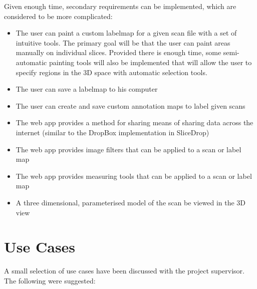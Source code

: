 \documentclass[a4paper,11pt,titlepage]{article}
\begin{document}
Given enough time, secondary requirements can be implemented, which are considered to be more complicated:

\begin{itemize}
\item The user can paint a custom labelmap for a given scan file with a set of intuitive tools. The primary goal will be that the user can paint areas manually on individual slices. Provided there is enough time, some semi-automatic painting tools will also be implemented that will allow the user to specify regions in the 3D space with automatic selection tools. 
\item The user can save a labelmap to his computer
\item The user can create and save custom annotation maps to label given scans
\item The web app provides a method for sharing  means of sharing data across the internet (similar to the DropBox implementation in SliceDrop)
\item The web app provides image filters that can be applied to a scan or label map
\item The web app provides measuring tools that can be applied to a scan or label map
\item A three dimensional, parameterised model of the scan be viewed in the 3D view
\end{itemize}

\section{Use Cases}

A small selection of use cases have been discussed with the project supervisor. The following were suggested:
\end{document}
